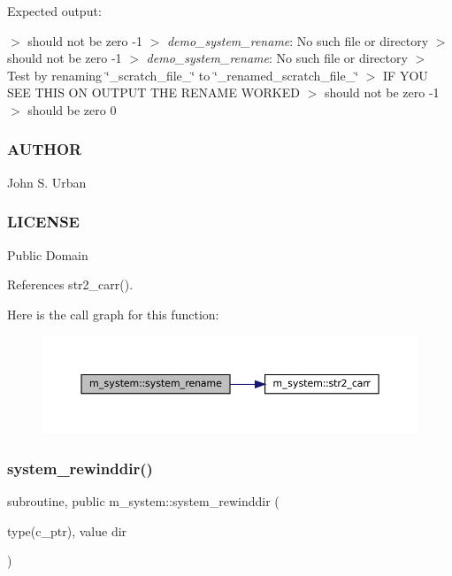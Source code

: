 Expected output\+:

$>$ should not be zero -\/1 $>$ {\itshape demo\+\_\+system\+\_\+rename}\+: No such file or directory $>$ should not be zero -\/1 $>$ {\itshape demo\+\_\+system\+\_\+rename}\+: No such file or directory $>$ Test by renaming \char`\"{}\+\_\+scratch\+\_\+file\+\_\+\char`\"{} to \char`\"{}\+\_\+renamed\+\_\+scratch\+\_\+file\+\_\+\char`\"{} $>$ IF Y\+OU S\+EE T\+H\+IS ON O\+U\+T\+P\+UT T\+HE R\+E\+N\+A\+ME W\+O\+R\+K\+ED $>$ should not be zero -\/1 $>$ should be zero 0

\subsubsection*{A\+U\+T\+H\+OR}

John S. Urban \subsubsection*{L\+I\+C\+E\+N\+SE}

Public Domain 

References str2\+\_\+carr().

Here is the call graph for this function\+:\nopagebreak
\begin{figure}[H]
\begin{center}
\leavevmode
\includegraphics[width=350pt]{namespacem__system_adfbaf3d17790da9ba0c520683d5b8003_cgraph}
\end{center}
\end{figure}
\mbox{\label{namespacem__system_a3ffe757195ade8052e8acabd196ee3ca}} 
\subsubsection{\texorpdfstring{system\+\_\+rewinddir()}{system\_rewinddir()}}
{\footnotesize\ttfamily subroutine, public m\+\_\+system\+::system\+\_\+rewinddir (\begin{DoxyParamCaption}\item[{type(c\+\_\+ptr), value}]{dir }\end{DoxyParamCaption})}



